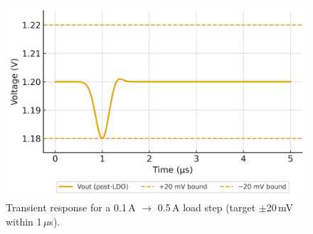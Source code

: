 \documentclass[journal]{IEEEtran}
\begin{document}
\begin{figure}[t]
  \centering
  \includegraphics[width=\columnwidth]{fig5_transient_response.png}
  \caption{Transient response for a 0.1\,A $\rightarrow$ 0.5\,A load step (target $\pm$20\,mV within 1\,$\mu$s).}
  \label{fig:transient}
\end{figure}

\end{document}
